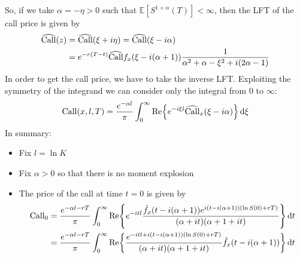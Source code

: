 So, if we take $\alpha = -\eta >0$ such that $\mathbb{E}[S^{1+\alpha}(T)]<\infty$, then the LFT of the call price is given by
\begin{align}
    \notag\widehat{\operatorname{Call}}(z) &= \widehat{\operatorname{Call}}(\xi+i\eta) = \widehat{\operatorname{Call}}(\xi-i\alpha) \\
    &=
    e^{-r(T-t)}\widehat{\operatorname{Call}}f_x(\xi - i(\alpha+1))\frac{1}{\alpha^2+\alpha-\xi^2+i(2\alpha-1)}
\end{align}
In order to get the call price, we have to take the inverse LFT. Exploiting the symmetry of the integrand we can consider only the integral from $0$ to $\infty$:
\begin{align}
    \operatorname{Call}(x,l,T) = \frac{e^{-\alpha l}}{\pi}\int_0^{\infty} \Re{e^{-i\xi l}\widehat{\operatorname{Call}}_x(\xi-i\alpha)}\,\dd\xi
\end{align}
In summary:
\begin{itemize}
    \item Fix $l=\ln K$
    \item Fix $\alpha >0$ so that there is no moment explosion
    \item The price of the call at time $t=0$ is given by
    \begin{align}
        \notag\operatorname{Call}_0 &= \frac{e^{-\alpha l -rT}}{\pi}\int_0^{\infty} \Re{e^{-itl}\frac{\hat{f}_x(t-i(\alpha+1))e^{i(t-i(\alpha+1))(\ln S(0)+rT)}}{(\alpha+it)(\alpha+1+it)}}\,\dd t \\
        &=
        \frac{e^{-\alpha l -rT}}{\pi}
        \int_0^{\infty}
        \Re{
        \frac{
        e^{-itl+i(t-i(\alpha+1))(\ln S(0)+rT)}}{(\alpha+it)(\alpha+1+it)}
        \hat{f}_x(t-i(\alpha+1))
        }\,\dd t
    \end{align}
\end{itemize}
